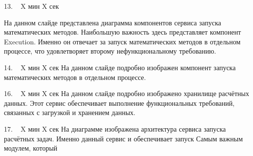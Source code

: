 \documentclass[11pt]{article}
\begin{document}
    13. ~ X мин X сек

    На данном слайде представлена диаграмма компонентов сервиса запуска математических методов.
    Наибольшую важность здесь представляет компонент Execution. Именно он отвечает за запуск математических методов
    в отдельном процессе, что удовлетворяет второму нефункциональному требованию.

    14. ~ X мин X сек
    На данном слайде подробно изображен компонент запуска математических методов в отдельном процессе.

    16. ~ X мин X сек
    На данном слайде подробно изображено хранилище расчётных данных.
    Этот сервис обеспечивает выполнение функциональных требований, связанных с загрузкой и хранением данных.

    17. ~ X мин X сек
    На диаграмме изображена архитектура сервиса запуска расчётных задач.
    Именно данный сервис и обеспечивает запуск
    Самым важным модулем, который
\end{document}
